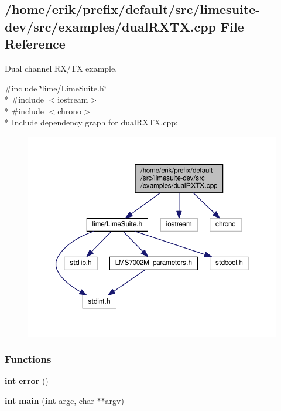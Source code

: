 \subsection{/home/erik/prefix/default/src/limesuite-\/dev/src/examples/dual\+R\+X\+TX.cpp File Reference}
\label{dualRXTX_8cpp}


Dual channel R\+X/\+TX example.  


{\ttfamily \#include \char`\"{}lime/\+Lime\+Suite.\+h\char`\"{}}\\*
{\ttfamily \#include $<$iostream$>$}\\*
{\ttfamily \#include $<$chrono$>$}\\*
Include dependency graph for dual\+R\+X\+T\+X.\+cpp\+:
\nopagebreak
\begin{figure}[H]
\begin{center}
\leavevmode
\includegraphics[width=350pt]{de/d6a/dualRXTX_8cpp__incl}
\end{center}
\end{figure}
\subsubsection*{Functions}
\begin{DoxyCompactItemize}
\item 
{\bf int} {\bf error} ()
\item 
{\bf int} {\bf main} ({\bf int} argc, char $\ast$$\ast$argv)
\end{DoxyCompactItemize}

